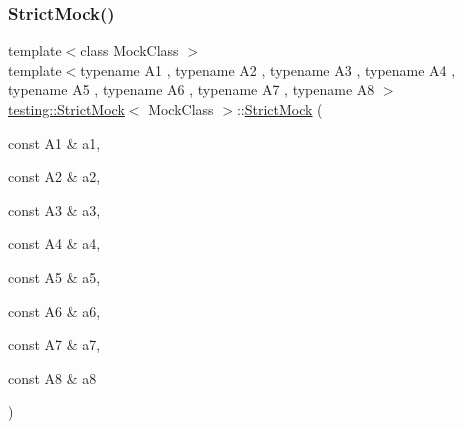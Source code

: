 \subsubsection{\texorpdfstring{Strict\+Mock()}{StrictMock()}\hspace{0.1cm}{\footnotesize\ttfamily [9/11]}}
{\footnotesize\ttfamily template$<$class Mock\+Class $>$ \\
template$<$typename A1 , typename A2 , typename A3 , typename A4 , typename A5 , typename A6 , typename A7 , typename A8 $>$ \\
\hyperlink{classtesting_1_1_strict_mock}{testing\+::\+Strict\+Mock}$<$ Mock\+Class $>$\+::\hyperlink{classtesting_1_1_strict_mock}{Strict\+Mock} (\begin{DoxyParamCaption}\item[{const A1 \&}]{a1,  }\item[{const A2 \&}]{a2,  }\item[{const A3 \&}]{a3,  }\item[{const A4 \&}]{a4,  }\item[{const A5 \&}]{a5,  }\item[{const A6 \&}]{a6,  }\item[{const A7 \&}]{a7,  }\item[{const A8 \&}]{a8 }\end{DoxyParamCaption})\hspace{0.3cm}{\ttfamily [inline]}}

\mbox{\label{classtesting_1_1_strict_mock_a4129f247ae087d586fdb04f450422d3e}} 
